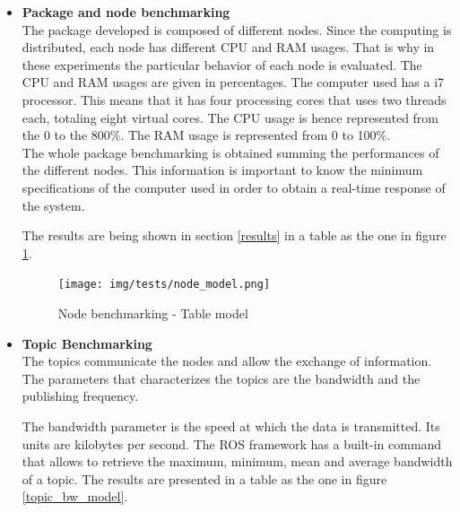 	\begin{itemize}


		\item{\textbf{Package and node benchmarking}}
		\\
		The package developed is composed of different nodes. 
		Since the computing is distributed, each node has different CPU and RAM usages.
		That is why in these experiments the particular behavior of each node is evaluated. 
		The CPU and RAM usages are given in percentages. 
		The computer used has a i7 processor. 
		This means that it has four processing cores that uses two threads each, totaling eight virtual cores. 
		The CPU usage is hence represented from the 0 to the 800\%.
		The RAM usage is represented from 0 to 100\%.
		\\[0.5cm]

		The whole package benchmarking is obtained summing the performances of the different nodes. 
		This information is important to know the minimum specifications of the computer used in order to obtain a real-time response of the system.  

		The results are being shown in section \ref{results} in a table as the one in figure \ref{node_model}.

		\begin{figure}[H]
				\begin{center}
			    \texttt{[image: img/tests/node\_model.png]}
				\caption[Node benchmarking - Table model]{Node benchmarking - Table model}
				\end{center}
				\label{node_model}
		\end{figure}

		\item{\textbf{Topic Benchmarking}}\\
		The topics communicate the nodes and allow the exchange of information. 
		The parameters that characterizes the topics are the bandwidth and the publishing frequency.
	
		The bandwidth parameter is the speed at which the data is transmitted. 
		Its units are kilobytes per second. 
		The ROS framework has a built-in command that allows to retrieve the maximum, minimum, mean and average bandwidth of a topic. 
		The results are presented in a table as the one in figure \ref{topic_bw_model}. 


\end{itemize}
